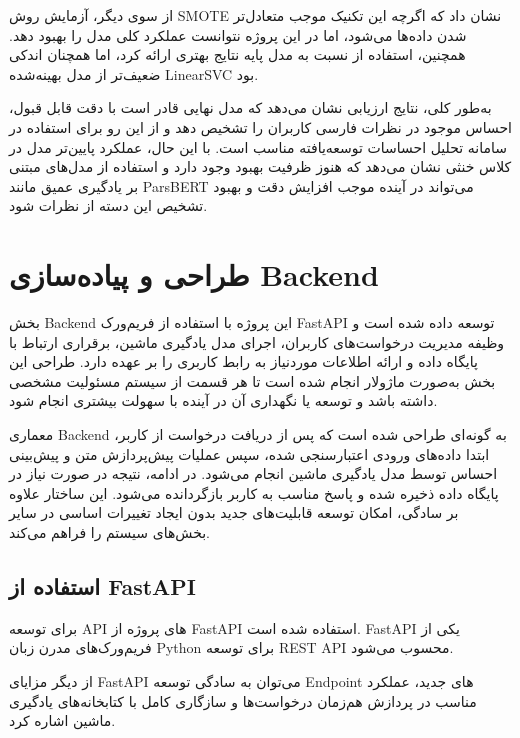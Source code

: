 از سوی دیگر، آزمایش روش SMOTE نشان داد که اگرچه این تکنیک موجب متعادل‌تر شدن داده‌ها می‌شود، اما در این پروژه نتوانست عملکرد کلی مدل را بهبود دهد. همچنین، استفاده از  نسبت به مدل پایه نتایج بهتری ارائه کرد، اما همچنان اندکی ضعیف‌تر از مدل بهینه‌شده LinearSVC بود.

به‌طور کلی، نتایج ارزیابی نشان می‌دهد که مدل نهایی قادر است با دقت قابل قبول، احساس موجود در نظرات فارسی کاربران را تشخیص دهد و از این رو برای استفاده در سامانه تحلیل احساسات توسعه‌یافته مناسب است. با این حال، عملکرد پایین‌تر مدل در کلاس خنثی نشان می‌دهد که هنوز ظرفیت بهبود وجود دارد و استفاده از مدل‌های مبتنی بر یادگیری عمیق مانند ParsBERT می‌تواند در آینده موجب افزایش دقت و بهبود تشخیص این دسته از نظرات شود.
\section{طراحی و پیاده‌سازی Backend}
بخش Backend این پروژه با استفاده از فریم‌ورک FastAPI توسعه داده شده است و وظیفه مدیریت درخواست‌های کاربران، اجرای مدل یادگیری ماشین، برقراری ارتباط با پایگاه داده و ارائه اطلاعات موردنیاز به رابط کاربری را بر عهده دارد. طراحی این بخش به‌صورت ماژولار انجام شده است تا هر قسمت از سیستم مسئولیت مشخصی داشته باشد و توسعه یا نگهداری آن در آینده با سهولت بیشتری انجام شود.

معماری Backend به گونه‌ای طراحی شده است که پس از دریافت درخواست از کاربر، ابتدا داده‌های ورودی اعتبارسنجی شده، سپس عملیات پیش‌پردازش متن و پیش‌بینی احساس توسط مدل یادگیری ماشین انجام می‌شود. در ادامه، نتیجه در صورت نیاز در پایگاه داده ذخیره شده و پاسخ مناسب به کاربر بازگردانده می‌شود. این ساختار علاوه بر سادگی، امکان توسعه قابلیت‌های جدید بدون ایجاد تغییرات اساسی در سایر بخش‌های سیستم را فراهم می‌کند.
\subsection{استفاده از FastAPI}
برای توسعه API های پروژه از FastAPI استفاده شده است. FastAPI یکی از فریم‌ورک‌های مدرن زبان Python برای توسعه REST API محسوب می‌شود.

از دیگر مزایای FastAPI می‌توان به سادگی توسعه Endpoint های جدید، عملکرد مناسب در پردازش هم‌زمان درخواست‌ها و سازگاری کامل با کتابخانه‌های یادگیری ماشین اشاره کرد.
